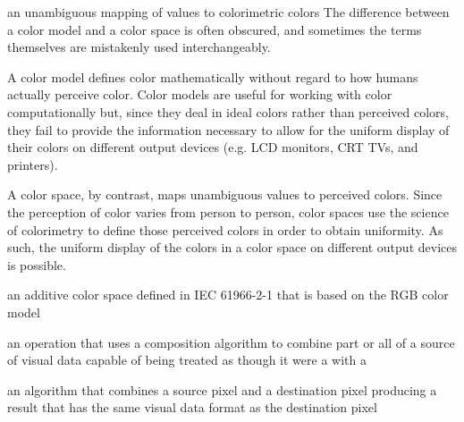 an unambiguous mapping of values to colorimetric colors
\enternote
The difference between a color model and a color space is often obscured, and sometimes the terms themselves are mistakenly used interchangeably.

A color model defines color mathematically without regard to how humans actually perceive color. Color models are useful for working with color computationally but, since they deal in ideal colors rather than perceived colors, they fail to provide the information necessary to allow for the uniform display of their colors on different output devices (e.g. LCD monitors, CRT TVs, and printers).

A color space, by contrast, maps unambiguous values to perceived colors. Since the perception of color varies from person to person, color spaces use the science of colorimetry to define those perceived colors in order to obtain uniformity. As such, the uniform display of the colors in a color space on different output devices is possible.
\exitnote

an additive color space defined in IEC 61966-2-1 that is based on the RGB color model

%
%
an operation that uses a composition algorithm to combine part or all of a source of visual data capable of being treated as though it were a \pixmap with a \pixmap

an algorithm that combines a source pixel and a destination pixel producing a result that has the same visual data format as the destination pixel

